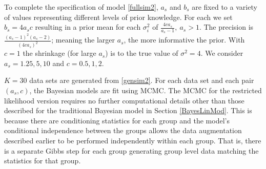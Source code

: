 \documentclass[ba]{imsart}
\begin{document}
To complete the specification of model \eqref{fullsim2},  $a_{s}$ and $b_{s}$ are fixed to a variety of values representing different levels of prior knowledge. For each we set $b_{s} = 4a_{s}c$ resulting in a prior mean for each $\sigma^{2}_{i}$ of $\frac{4ca_{s}}{a_{s}-1}, \ a_{s} >1$. The precision is $\frac{(a_{s} -1)^{2}(a_{s}-2)}{(4ca_{s})^{2}}$; meaning the larger $a_{s}$, the more informative the prior. With $c = 1$ the shrinkage (for large $a_{s}$) is to the true value of $\sigma^{2} = 4$. We consider $a_{s} = 1.25,  5, 10$ and $c = 0.5, 1, 2$. %

$K = 30$ data sets are generated from \eqref{gensim2}. For each data set and each pair $(a_{s}, c)$, the Bayesian models are fit using MCMC. The MCMC for the restricted likelihood version requires no further computational details other than those described for the traditional Bayesian model in Section \ref{BayesLinMod}. This is because there are conditioning statistics for each group and the model's conditional independence between the groups allows the data augmentation described earlier to be performed independently within each group. That is, there is a separate Gibbs step for each group  generating group level data matching the statistics for that group. 
\end{document}
